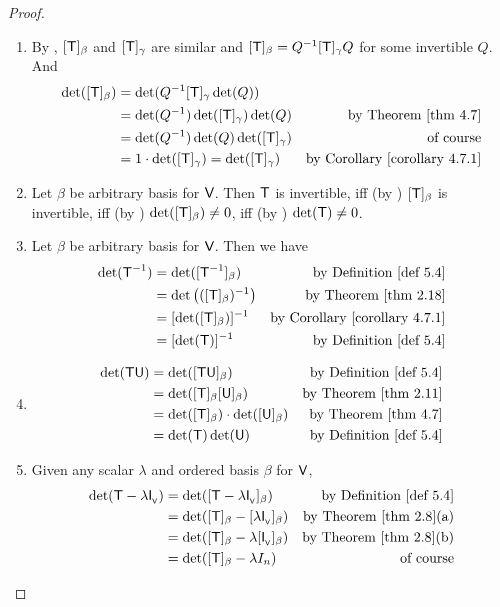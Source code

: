 \begin{proof} \ 

\begin{enumerate}
\item By , \([\textsf{T}]_{\beta}\) and \([\textsf{T}]_{\gamma}\) are similar and \([\textsf{T}]_{\beta} = Q^{-1} [\textsf{T}]_{\gamma} Q\) for some invertible \(Q\).
And
\begin{align*}
    \det([\T]_{\beta}) & = \det(Q^{-1} [\T]_{\gamma} \det(Q)) \\
        & = \det(Q^{-1}) \det([\T]_{\gamma}) \det(Q) & \text{by \THM{4.7}} \\
        & = \det(Q^{-1}) \det(Q) \det([\T]_{\gamma}) & \text{of course} \\
        & = 1 \cdot \det([\T]_{\gamma}) =  \det([\T]_{\gamma}) & \text{by \CORO{4.7.1}}
\end{align*}

\item Let \(\beta\) be arbitrary basis for \(\textsf{V}\).
Then \(\textsf{T}\) is invertible, iff (by ) \([\textsf{T}]_{\beta}\) is invertible, iff (by ) \(\det([\textsf{T}]_{\beta}) \ne 0\), iff (by ) \(\det(\textsf{T}) \ne 0\).

\item Let \(\beta\) be arbitrary basis for \(\textsf{V}\).
Then we have
\begin{align*}
    \det(\T^{-1}) & = \det([\T^{-1}]_{\beta}) & \text{by \DEF{5.4}} \\
                  & = \det\left( ([\T]_{\beta})^{-1} \right) & \text{by \THM{2.18}} \\
                  & = [\det([\T]_{\beta})]^{-1} & \text{by \CORO{4.7.1}} \\
                  & = [\det(\T)]^{-1} & \text{by \DEF{5.4}}
\end{align*}

\item
\begin{align*}
    \det(\T\U) & = \det([\T\U]_{\beta}) & \text{by \DEF{5.4}} \\
               & = \det([\T]_{\beta} [\U]_{\beta}) & \text{by \THM{2.11}} \\
               & = \det([\T]_{\beta}) \cdot \det([\U]_{\beta}) & \text{by \THM{4.7}} \\
               & = \det(\T) \det(\U) & \text{by \DEF{5.4}}
\end{align*}

\item
Given any scalar \(\lambda\) and ordered basis \(\beta\) for \(\textsf{V}\),
\begin{align*}
    \det(\T - \lambda \ITRANV) & = \det([\T - \lambda \ITRANV]_{\beta}) & \text{by \DEF{5.4}} \\
        & = \det([\T]_{\beta} - [\lambda \ITRANV]_{\beta}) & \text{by \THM{2.8}(a)} \\
        & = \det([\T]_{\beta} - \lambda[\ITRANV]_{\beta}) & \text{by \THM{2.8}(b)} \\
        & = \det([\T]_{\beta} - \lambda I_n) & \text{of course}
\end{align*}
\end{enumerate}
\end{proof}

